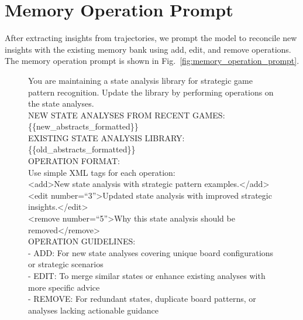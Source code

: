 \section{Memory Operation Prompt}
\label{appendix:memory-operation-prompt}

After extracting insights from trajectories, we prompt the model to reconcile new insights with the existing memory bank using add, edit, and remove operations. The memory operation prompt is shown in Fig.~\ref{fig:memory_operation_prompt}.

\begin{figure}[H]
\centering

\begin{tcolorbox}[
    colback=blue!5!white,
    colframe=blue!40!white,
    left=1mm, right=1mm, top=1mm, bottom=1mm,
    width=\textwidth,
    enhanced,
    attach boxed title to top center={yshift=-2mm},
    boxed title style={colback=blue!40!white},
    title={Memory Operation Prompt Template},
    fontupper=\footnotesize,
    fonttitle=\small,
    label=box:memory_operation_prompt
]
You are maintaining a state analysis library for strategic game pattern recognition. Update the library by performing operations on the state analyses.\\

NEW STATE ANALYSES FROM RECENT GAMES:\\
\{\{new\_abstracts\_formatted\}\}\\

EXISTING STATE ANALYSIS LIBRARY:\\
\{\{old\_abstracts\_formatted\}\}\\

OPERATION FORMAT:\\
Use simple XML tags for each operation:\\

\textless add\textgreater New state analysis with strategic pattern examples.\textless /add\textgreater\\
\textless edit number=``3''\textgreater Updated state analysis with improved strategic insights.\textless /edit\textgreater\\
\textless remove number=``5''\textgreater Why this state analysis should be removed\textless /remove\textgreater\\

OPERATION GUIDELINES:\\
- ADD: For new state analyses covering unique board configurations or strategic scenarios\\
- EDIT: To merge similar states or enhance existing analyses with more specific advice\\
- REMOVE: For redundant states, duplicate board patterns, or analyses lacking actionable guidance\\


\end{tcolorbox}
\end{figure}

